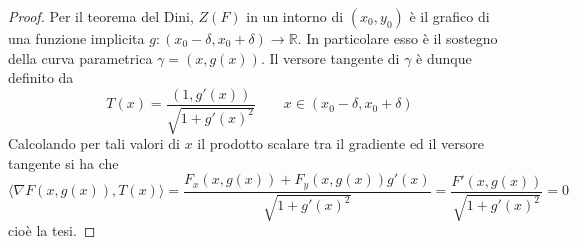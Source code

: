 \begin{proof}
    Per il teorema del Dini, $Z(F)$ in un intorno di $(x_0, y_0)$ è il grafico di una funzione implicita $g: (x_0- \delta, x_0+ \delta) \to \mathbb{R}$. In particolare esso è il sostegno della curva parametrica $\gamma = (x, g(x))$. Il versore tangente di $\gamma$ è dunque definito da
    \begin{equation}
        T(x)= \frac{(1, g'(x))}{\sqrt{1+g'(x)^2}} \qquad x \in (x_0- \delta, x_0+ \delta)
    \end{equation}
    Calcolando per tali valori di $x$ il prodotto scalare tra il gradiente ed il versore tangente si ha che
    \begin{equation}
        \langle \nabla F (x, g(x)), T(x) \rangle= \frac{F_x(x, g(x)) + F_y(x, g(x))g'(x)}{\sqrt{1+g'(x)^2}}=\frac{F'(x, g(x))}{\sqrt{1+g'(x)^2}}=0
    \end{equation}
    cioè la tesi.
\end{proof}

